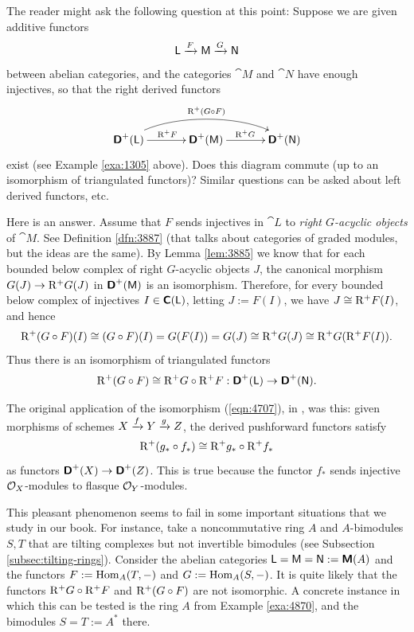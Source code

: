 \begin{rem} \label{rem:4695}
The reader might ask the following question at this point: 
Suppose we are given additive functors
\begin{equation} \label{eqn:4705}
\operatorname{\mathsf{L}} \xrightarrow{F} \operatorname{\mathsf{M}} \xrightarrow{G} \operatorname{\mathsf{N}}
\end{equation}
between abelian categories, and the categories 
$\cat{M}$ and $\cat{N}$ have enough injectives, so that the right derived 
functors 
\begin{equation} \label{eqn:4706}
\UseTips \xymatrix @C=8ex @R=8ex { 
\dcat{D}^+(\cat{L})
\ar[r]^{\mrm{R}^+ F}
\ar@(ur,ul)[rr]^{\mrm{R}^+ (G \circ F)}
&
\dcat{D}^+(\cat{M})
\ar[r]^{\mrm{R}^+ G}
&
\dcat{D}^+(\cat{N})
}
\end{equation}
exist (see Example \ref{exa:1305} above). Does this diagram commute (up to 
an isomorphism of triangulated functors)? Similar questions can be asked about 
left derived functors, etc. 

Here is an answer.  Assume that $F$ sends injectives in 
$\cat{L}$ to {\em right $G$-acyclic objects} of $\cat{M}$. See Definition
\ref{dfn:3887} (that talks about categories of graded modules, but the ideas 
are the same). By Lemma \ref{lem:3885} we know that for each bounded 
below complex of right $G$-acyclic objects $J$, the canonical morphism 
$G(J) \to \mathrm{R}^+ G(J)$ in $\boldsymbol{\mathsf{D}}^+(\operatorname{\mathsf{M}})$ is an isomorphism. 
Therefore, for every bounded below complex of injectives
$I \in \boldsymbol{\mathsf{C}}(\operatorname{\mathsf{L}})$,
letting $J := F(I)$,  we have $J \cong \mathrm{R}^+ F(I)$, and hence 
\[ \mathrm{R}^+ (G \circ F)(I) \cong (G \circ F)(I) = G(F(I)) = G(J) \cong 
\mathrm{R}^+ G(J) \cong \mathrm{R}^+ G (\mathrm{R}^+ F(I)) . \]
Thus there is an isomorphism of triangulated functors  
\begin{equation} \label{eqn:4707}
\mathrm{R}^+ (G \circ F) \cong \mathrm{R}^+ G \circ \mathrm{R}^+  F : 
\boldsymbol{\mathsf{D}}^+(\operatorname{\mathsf{L}}) \to \boldsymbol{\mathsf{D}}^+(\operatorname{\mathsf{N}}) .
\end{equation}

The original application of the isomorphism (\ref{eqn:4707}),
in \cite[Proposition II.5.1]{RD}, was this: given morphisms of schemes 
$X \xrightarrow{f} Y \xrightarrow{g} Z$, the derived pushforward functors satisfy
\begin{equation} \label{eqn:5034}
\mathrm{R}^+ (g_* \circ f_*) \cong \mathrm{R}^+ g_* \circ \mathrm{R}^+ f_*
\end{equation}
as functors $\boldsymbol{\mathsf{D}}^+(X) \to \boldsymbol{\mathsf{D}}^+(Z)$. 
This is true because the functor $f_*$ sends injective $\mathcal{O}_X$-modules to 
flasque $\mathcal{O}_Y$-modules. 

This pleasant phenomenon seems to fail in some important situations 
that we study in our book. For instance, take a noncommutative ring $A$ and 
$A$-bimodules $S, T$ that are tilting complexes but not invertible 
bimodules (see Subsection \ref{subsec:tilting-rings}).  
Consider the abelian categories 
$\operatorname{\mathsf{L}} = \operatorname{\mathsf{M}} = \operatorname{\mathsf{N}} := \boldsymbol{\mathsf{M}}(A)$
and the functors $F := \operatorname{Hom}_A(T, -)$ and $G := \operatorname{Hom}_A(S, -)$. 
It is quite likely that the functors $\mathrm{R}^+G \circ \mathrm{R}^+F$ and 
$\mathrm{R}^+(G \circ F)$ are not isomorphic. 
A concrete instance in which this can be tested is the ring $A$ 
from Example \ref{exa:4870}, and the bimodules $S = T := A^*$ there.
\end{rem}

